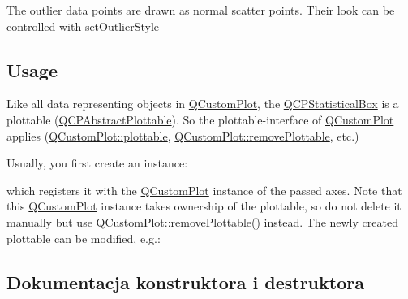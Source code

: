 The outlier data points are drawn as normal scatter points. Their look can be controlled with \hyperlink{class_q_c_p_statistical_box_ad5241943422eb8e58360a97e99ad6aa7}{set\+Outlier\+Style}\hypertarget{class_q_c_p_statistical_box_qcpstatisticalbox-usage}{}\subsection{Usage}\label{class_q_c_p_statistical_box_qcpstatisticalbox-usage}
Like all data representing objects in \hyperlink{class_q_custom_plot}{Q\+Custom\+Plot}, the \hyperlink{class_q_c_p_statistical_box}{Q\+C\+P\+Statistical\+Box} is a plottable (\hyperlink{class_q_c_p_abstract_plottable}{Q\+C\+P\+Abstract\+Plottable}). So the plottable-\/interface of \hyperlink{class_q_custom_plot}{Q\+Custom\+Plot} applies (\hyperlink{class_q_custom_plot_a32de81ff53e263e785b83b52ecd99d6f}{Q\+Custom\+Plot\+::plottable}, \hyperlink{class_q_custom_plot_af3dafd56884208474f311d6226513ab2}{Q\+Custom\+Plot\+::remove\+Plottable}, etc.)

Usually, you first create an instance\+: 
\begin{DoxyCodeInclude}
\end{DoxyCodeInclude}
which registers it with the \hyperlink{class_q_custom_plot}{Q\+Custom\+Plot} instance of the passed axes. Note that this \hyperlink{class_q_custom_plot}{Q\+Custom\+Plot} instance takes ownership of the plottable, so do not delete it manually but use \hyperlink{class_q_custom_plot_af3dafd56884208474f311d6226513ab2}{Q\+Custom\+Plot\+::remove\+Plottable()} instead. The newly created plottable can be modified, e.\+g.\+: 
\begin{DoxyCodeInclude}
\end{DoxyCodeInclude}


\subsection{Dokumentacja konstruktora i destruktora}
